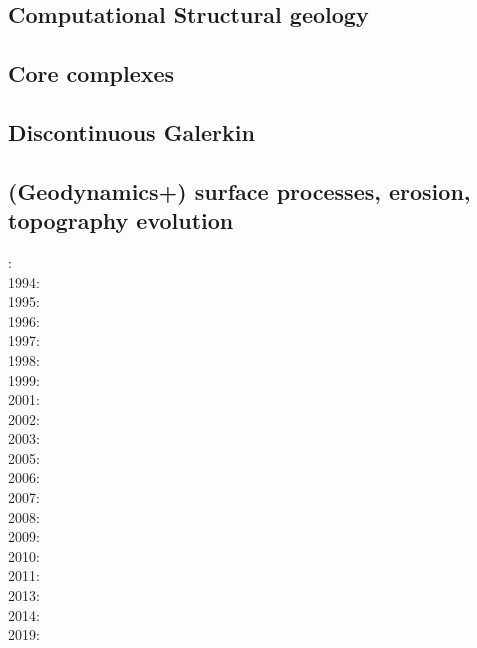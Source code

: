 \subsection*{Computational Structural geology}

\cite{acgf00}
\cite{trla00}
\cite{masc01}
\cite{manc08}

\subsection*{Core complexes}

\cite{lehm12}

\subsection*{Discontinuous Galerkin}

\cite{kauf12}\cite{ngpc10}\cite{coks09}\cite{fewk17}\cite{kans08}\cite{geor11}
\cite{cogo09}\cite{cacp02}\cite{cacs05}\cite{coks05}\cite{coks02}\cite{coks00}
\cite{mofh08}\cite{iglo17}\cite{ngpe12}\cite{puth18}\cite{hepb17}\cite{ngpc11}
\cite{conp10}\cite{mofp10}\cite{lelk15} 

\subsection*{(Geodynamics+) surface processes, erosion, topography evolution}

: \cite{befh92}\\
1994: \cite{howa94}\cite{koon94}\cite{kobe94}\\
1995: \cite{chmm95}\cite{koon95}\\
1996: \cite{avbu96}\\
1997: \cite{brsa97}\\
1998: \cite{deea98}\\
1999: \cite{will99a}\cite{bupi99}\cite{babr99}\\
2001: \cite{zemk01}\cite{tulg01}\cite{brsh01}\cite{bupo01}\cite{coul01}\cite{crda01}\\
2002: \cite{wibr02}\\
2003: \cite{brau03}\\
2005: \cite{lave05}\cite{will05}\\
2006: \cite{rosw06}\cite{brau06gsl}\\
2007: \cite{buto07}\\
2008: \cite{alle08}\cite{rowf08}\\
2009: \cite{whip09}\cite{kuhe09}\\
2010: \cite{will10}\cite{tuha10}\cite{brau10b}\cite{brau10}\cite{brya10}\cite{cmwt10}\\
2011: \cite{robr11}\\
2013: \cite{vehc13}\cite{brwi13}\cite{fihv13a}\cite{fihv13b} \\
2014: \cite{crbr14}\cite{cokm14}\cite{erhv14}\cite{erhv15} \\
2019: \cite{anpa19}

